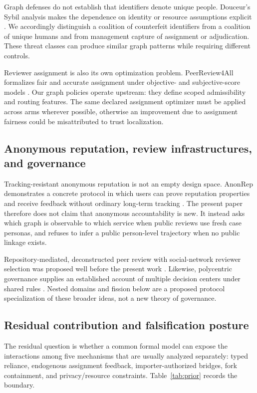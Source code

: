 \documentclass[11pt]{article}
\begin{document}
Graph defenses do not establish that identifiers denote unique people.  Douceur's Sybil analysis makes the dependence on identity or resource assumptions explicit \citep{douceur2002sybil}.  We accordingly distinguish a coalition of counterfeit identifiers from a coalition of unique humans and from management capture of assignment or adjudication.  These threat classes can produce similar graph patterns while requiring different controls.

Reviewer assignment is also its own optimization problem.  PeerReview4All formalizes fair and accurate assignment under objective- and subjective-score models \citep{stelmakh2021peerreview4all}.  Our graph policies operate upstream: they define scoped admissibility and routing features.  The same declared assignment optimizer must be applied across arms wherever possible, otherwise an improvement due to assignment fairness could be misattributed to trust localization.

\subsection{Anonymous reputation, review infrastructures, and governance}

Tracking-resistant anonymous reputation is not an empty design space.  AnonRep demonstrates a concrete protocol in which users can prove reputation properties and receive feedback without ordinary long-term tracking \citep{zhai2016anonrep}.  The present paper therefore does not claim that anonymous accountability is new.  It instead asks which graph is observable to which service when public reviews use fresh case personas, and refuses to infer a public person-level trajectory when no public linkage exists.

Repository-mediated, deconstructed peer review with social-network reviewer selection was proposed well before the present work \citep{rodriguez2006convergence}.  Likewise, polycentric governance supplies an established account of multiple decision centers under shared rules \citep{ostrom2010polycentric}.  Nested domains and fission below are a proposed protocol specialization of these broader ideas, not a new theory of governance.

\subsection{Residual contribution and falsification posture}

The residual question is whether a common formal model can expose the interactions among five mechanisms that are usually analyzed separately: typed reliance, endogenous assignment feedback, importer-authorized bridges, fork containment, and privacy/resource constraints.  Table~\ref{tab:prior} records the boundary.
\end{document}
